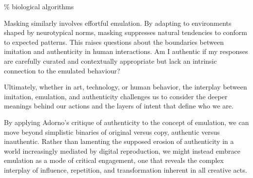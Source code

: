 {\scriptsize \textcolor{comment}{\%  biological algorithms}}

Masking similarly involves effortful emulation. By adapting to environments shaped by neurotypical norms, masking suppresses natural tendencies to conform to expected patterns. This raises questions about the boundaries between imitation and authenticity in human interactions. Am I authentic if my responses are carefully curated and contextually appropriate but lack an intrinsic connection to the emulated behaviour?

Ultimately, whether in art, technology, or human behavior, the interplay between imitation, emulation, and authenticity challenges us to consider the deeper meanings behind our actions and the layers of intent that define who we are.

By applying Adorno's critique of authenticity to the concept of emulation, we can move beyond simplistic binaries of original versus copy, authentic versus inauthentic. Rather than lamenting the supposed erosion of authenticity in a world increasingly mediated by digital reproduction, we might instead embrace emulation as a mode of critical engagement, one that reveals the complex interplay of influence, repetition, and transformation inherent in all creative acts.